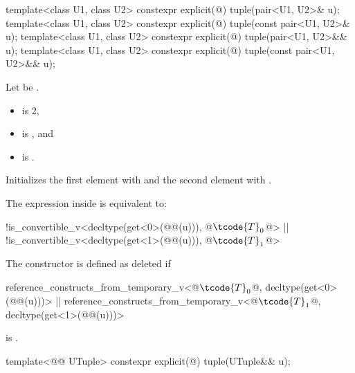 %
\begin{itemdecl}
template<class U1, class U2> constexpr explicit(@\seebelow@) tuple(pair<U1, U2>& u);
template<class U1, class U2> constexpr explicit(@\seebelow@) tuple(const pair<U1, U2>& u);
template<class U1, class U2> constexpr explicit(@\seebelow@) tuple(pair<U1, U2>&& u);
template<class U1, class U2> constexpr explicit(@\seebelow@) tuple(const pair<U1, U2>&& u);
\end{itemdecl}

\begin{itemdescr}
\pnum
Let  be .

\pnum
\constraints
\begin{itemize}
\item
{} is 2,
\item
{} is , and
\item
{} is .
\end{itemize}

\pnum
\effects
Initializes the first element with  and
the second element with .

\pnum
\remarks
The expression inside  is equivalent to:
\begin{codeblock}
!is_convertible_v<decltype(get<0>(@@(u))), @$\tcode{T}_0$@> ||
!is_convertible_v<decltype(get<1>(@@(u))), @$\tcode{T}_1$@>
\end{codeblock}
The constructor is defined as deleted if
\begin{codeblock}
reference_constructs_from_temporary_v<@$\tcode{T}_0$@, decltype(get<0>(@@(u)))> ||
reference_constructs_from_temporary_v<@$\tcode{T}_1$@, decltype(get<1>(@@(u)))>
\end{codeblock}
is .
\end{itemdescr}

%
\begin{itemdecl}
template<@@ UTuple>
  constexpr explicit(@\seebelow@) tuple(UTuple&& u);
\end{itemdecl}

